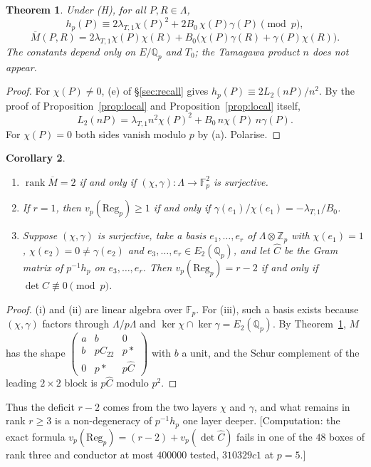 \documentclass[11pt,a4paper]{amsart}
\newcommand{\Qp}{\mathbb{Q}_p}
\newcommand{\Zp}{\mathbb{Z}_p}
\newcommand{\Fp}{\mathbb{F}_p}
\newcommand{\Reg}{\mathrm{Reg}}
\newcommand{\Lam}{\Lambda}
\newcommand{\Mb}{\overline{M}}
\theoremstyle{plain}
\newtheorem{theorem}{Theorem}[section]
\newtheorem{corollary}[theorem]{Corollary}
\theoremstyle{definition}
\theoremstyle{remark}
\begin{document}
\begin{theorem}\label{thm:K}
Under \textup{(H)}, for all $P,R\in\Lam$,
\[
h_p(P)\equiv2\lambda_{T,1}\chi(P)^2+2B_0\,\chi(P)\gamma(P)\pmod p,
\]
\[
\Mb(P,R)=2\lambda_{T,1}\chi(P)\chi(R)+B_0\bigl(\chi(P)\gamma(R)+\gamma(P)\chi(R)\bigr).
\]
The constants depend only on $E/\Qp$ and $T_0$; the Tamagawa product $n$ does not appear.
\end{theorem}

\begin{proof}
For $\chi(P)\ne0$, (e) of \S\ref{sec:recall} gives $h_p(P)\equiv2L_2(nP)/n^2$. By the proof of Proposition~\ref{prop:local} and Proposition~\ref{prop:local} itself,
\[
L_2(nP)=\lambda_{T,1}n^2\chi(P)^2+B_0\,n\chi(P)\,n\gamma(P).
\]
For $\chi(P)=0$ both sides vanish modulo $p$ by (a). Polarise.
\end{proof}

\begin{corollary}\label{cor:K}
\begin{enumerate}[label=\textup{(\roman*)}]
\item $\operatorname{rank}\Mb=2$ if and only if $(\chi,\gamma)\colon\Lam\to\Fp^2$ is surjective.
\item If $r=1$, then $v_p(\Reg_p)\ge1$ if and only if $\gamma(e_1)/\chi(e_1)=-\lambda_{T,1}/B_0$.
\item Suppose $(\chi,\gamma)$ is surjective, take a basis $e_1,\dots,e_r$ of $\Lam\otimes\Zp$ with $\chi(e_1)=1$, $\chi(e_2)=0\ne\gamma(e_2)$ and $e_3,\dots,e_r\in E_2(\Qp)$, and let $\widehat C$ be the Gram matrix of $p^{-1}h_p$ on $e_3,\dots,e_r$. Then $v_p(\Reg_p)=r-2$ if and only if $\det\widehat C\not\equiv0\pmod p$.
\end{enumerate}
\end{corollary}

\begin{proof}
(i) and (ii) are linear algebra over $\Fp$. For (iii), such a basis exists because $(\chi,\gamma)$ factors through $\Lam/p\Lam$ and $\ker\chi\cap\ker\gamma=E_2(\Qp)$. By Theorem~\ref{thm:K}, $M$ has the shape $\left(\begin{smallmatrix}a&b&0\\ b&pC_{22}&p*\\ 0&p*&p\widehat C\end{smallmatrix}\right)$ with $b$ a unit, and the Schur complement of the leading $2\times2$ block is $p\widehat C$ modulo $p^2$.
\end{proof}

Thus the deficit $r-2$ comes from the two layers $\chi$ and $\gamma$, and what remains in rank $r\ge3$ is a non-degeneracy of $p^{-1}h_p$ one layer deeper. [Computation: the exact formula $v_p(\Reg_p)=(r-2)+v_p(\det\widehat C)$ fails in one of the $48$ boxes of rank three and conductor at most $400000$ tested, $310329c1$ at $p=5$.]
\end{document}
